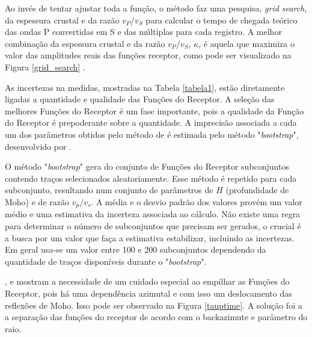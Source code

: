 Ao invés de tentar ajustar toda a função, o método faz uma pesquisa, \textit{grid search}, da espessura crustal e da razão $v_{P}$/$v_{S}$ para calcular o tempo de chegada teórico das ondas P convertidas em S e das múltiplas para cada registro. A melhor combinação da espessura crustal e da razão $v_{P}$/$v_{S}$, $\kappa$, é aquela que maximiza o valor das amplitudes reais das funções receptor, como pode ser visualizado na Figura \ref{grid_search} .

As incertezas na medidas, mostradas na Tabela \ref{tabela1}, estão diretamente ligadas a quantidade e qualidade das Funções do Receptor. A seleção das melhores Funções do Receptor é um fase importante, pois a qualidade da Função do Receptor é prepoderante sobre a quantidade. A imprecisão associada a cada um dos parâmetros obtidos pelo método de \cite{Zhu_Kanamori_2000} é estimada pelo método "\textit{bootstrap}", desenvolvido por \cite{efron_statistical_1991}.

O método "\textit{bootstrap}" gera do conjunto de Funções do Receptor subconjuntos contendo traços selecionados aleatoriamente. Esse método é repetido para cada subconjunto, resultando num conjunto de parâmetros de $H$ (profundidade de Moho) e de razão $v_{p}/v_{s}$. A média e o desvio padrão dos valores provém um valor médio e uma estimativa da incerteza associada ao cálculo. Não existe uma regra para determinar o número de subconjuntos que precisam ser gerados, o crucial é a busca por um valor que faça a estimativa estabilizar, incluindo as incertezas. Em geral usa-se um valor entre 100 e 200 subconjuntos dependendo da quantidade de traços disponíveis durante o "\textit{bootstrap}".

\cite{assumpcao_crustal_2002},\cite{sand_franca_crustal_2004} e \cite{julia_deep_2008} mostram a necessidade de um cuidado especial ao empilhar as Funções do Receptor, pois há uma dependência azimutal  e com isso um deslocamento das reflexões de Moho. Isso pode ser observado na Figura \ref{tauptime}. A solução foi a a separação das funções do receptor de acordo com o backazimute e parâmetro do raio. 

